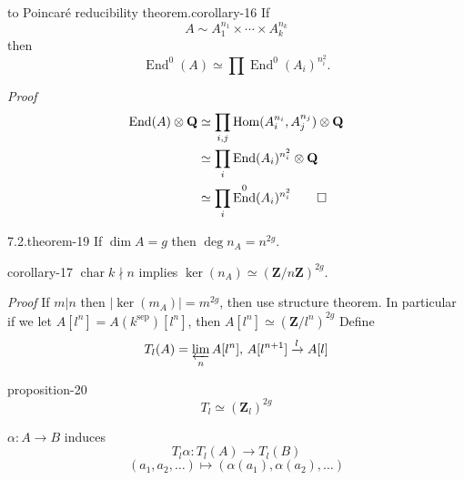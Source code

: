 \documentclass[10pt,]{book}
\makeatletter
\renewcommand*{\proofname}{Proof}
\renewenvironment{proof}[1][\proofname]{\par
  \pushQED{\qed}%
  \normalfont \topsep6\p@\@plus6\p@\relax
  \trivlist
  \item\relax
    {\itshape
    #1\@addpunct{.}}\hspace\labelsep\ignorespaces
}{%
  \popQED\endtrivlist\@endpefalse
}
\numberwithin{equation}{section}
\newcommand{\lb}{[}
\newcommand{\rb}{]}
\newcommand{\ZZ}{\mathbf{Z}}
\newcommand{\QQ}{\mathbf{Q}}
\newcommand{\sep}{\mathrm{sep}}
\DeclareMathOperator{\End}{End}
\DeclareMathOperator{\Hom}{Hom}
\DeclareMathOperator{\characteristic}{char}
\newcommand{\amp}{&}
\makeatother
\begin{document}
\begin{corollary}{to Poincaré reducibility theorem.}{}{corollary-16}%
\hypertarget{p-221}{}%
If%
\begin{equation*}
A\sim A_1^{n_1} \times \cdots \times A_k^{n_k}
\end{equation*}
then%
\begin{equation*}
\End^0(A) \simeq \prod \End^0(A_i)^{n_i^2}\text{.}
\end{equation*}
%
\end{corollary}
\begin{proof}\hypertarget{proof-41}{}
\hypertarget{p-222}{}%
%
\begin{align*}
\End(A) \otimes \QQ \amp \simeq \prod_{i,j} \Hom(A_i^{n_i}, A_j^{n_j}) \otimes \QQ\\
\amp \simeq \prod_{i} \End(A_i)^{n_i^2} \otimes \QQ\\
\amp \simeq \prod_{i} \End^0(A_i)^{n_i^2}\qedhere
\end{align*}
%
\end{proof}
\begin{theorem}{7.2.}{}{theorem-19}%
\hypertarget{p-223}{}%
If \(\dim A = g\) then \(\deg n_A  =n^{2g}\).%
\end{theorem}
\begin{corollary}{}{}{corollary-17}%
\hypertarget{p-224}{}%
\(\characteristic k \nmid n\) implies \(\ker(n_A) \simeq (\ZZ/n\ZZ)^{2g}\).%
\end{corollary}
\begin{proof}\hypertarget{proof-42}{}
\hypertarget{p-225}{}%
If  \(m | n\) then \(|\ker (m_A)| = m^{2g}\), then use structure theorem.%
\end{proof}
\hypertarget{p-226}{}%
In particular if we let \(A\lb l^n\rb = A(k^\sep) \lb l^n\rb\), then \(A\lb l^n\rb \simeq (\ZZ/l^n)^{2g}\) Define%
\begin{equation*}
T_l(A) = \varprojlim_n A[l^n],\, A[l^{n+1}] \xrightarrow{l} A[l]
\end{equation*}
%
\begin{proposition}{}{}{proposition-20}%
\hypertarget{p-227}{}%
%
\begin{equation*}
T_l \simeq (\ZZ_l)^{2g}
\end{equation*}
%
\end{proposition}
\hypertarget{p-228}{}%
\(\alpha \colon A \to B\) induces%
\begin{equation*}
T_l\alpha\colon T_l(A) \to T_l(B)
\end{equation*}
%
\begin{equation*}
(a_1,a_2, \ldots) \mapsto(\alpha(a_1),\alpha(a_2), \ldots)
\end{equation*}
\end{document}
